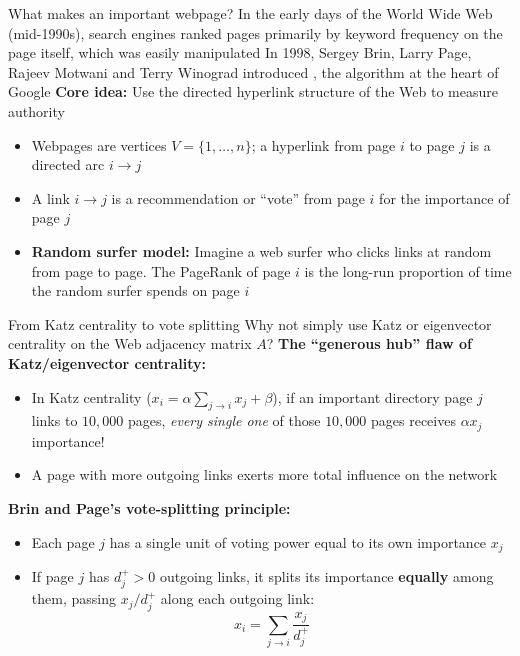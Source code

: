 \documentclass[aspectratio=169]{beamer}\usepackage[]{graphicx}\usepackage[]{xcolor}
\begin{document}


\begin{frame}{What makes an important webpage?}
In the early days of the World Wide Web (mid-1990s), search engines ranked pages primarily by keyword frequency on the page itself, which was easily manipulated
\vfill
In 1998, Sergey Brin, Larry Page, Rajeev Motwani and Terry Winograd introduced , the algorithm at the heart of Google
\vfill
\textbf{Core idea:} Use the directed hyperlink structure of the Web to measure authority
\begin{itemize}
\item Webpages are vertices $V = \{1, \ldots, n\}$; a hyperlink from page $i$ to page $j$ is a directed arc $i \to j$
\item A link $i \to j$ is a recommendation or ``vote'' from page $i$ for the importance of page $j$
\item \textbf{Random surfer model:} Imagine a web surfer who clicks links at random from page to page. The PageRank of page $i$ is the long-run proportion of time the random surfer spends on page $i$
\end{itemize}
\end{frame}

\begin{frame}{From Katz centrality to vote splitting}
Why not simply use Katz or eigenvector centrality on the Web adjacency matrix $A$?
\vfill
\textbf{The ``generous hub'' flaw of Katz/eigenvector centrality:}
\begin{itemize}
\item In Katz centrality ($x_i = \alpha \sum_{j \to i} x_j + \beta$), if an important directory page $j$ links to $10{,}000$ pages, \emph{every single one} of those $10{,}000$ pages receives $\alpha x_j$ importance!
\item A page with more outgoing links exerts more total influence on the network
\end{itemize}
\vfill
\textbf{Brin and Page's vote-splitting principle:}
\begin{itemize}
\item Each page $j$ has a single unit of voting power equal to its own importance $x_j$
\item If page $j$ has $d_j^+ > 0$ outgoing links, it splits its importance \textbf{equally} among them, passing $x_j / d_j^+$ along each outgoing link:
\[
x_i = \sum_{j \to i} \frac{x_j}{d_j^+}
\]
\end{itemize}
\end{frame}
\end{document}

